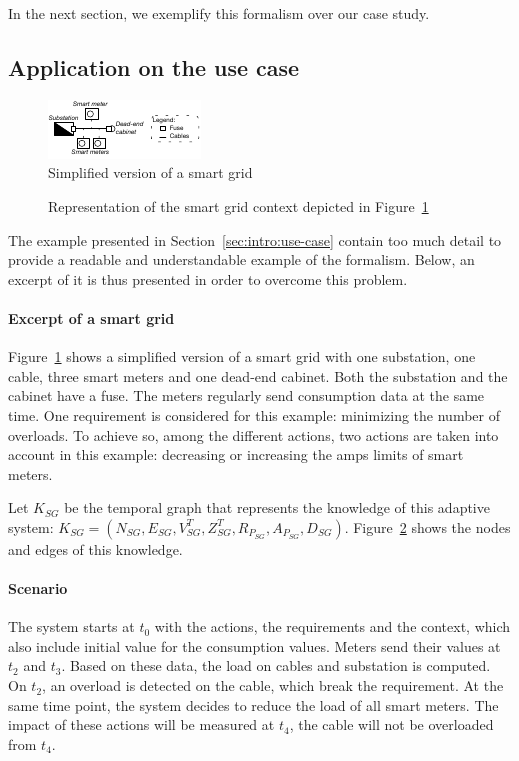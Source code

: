In the next section, we exemplify this formalism over our case study.


\subsection{Application on the use case}
\begin{figure}
	\centering
	\includegraphics[width=0.5\linewidth]{img/chapt-tkm/formalism/excerptSG}
	\caption{Simplified version of a smart grid}
	\label{fig:tkm:excerptSG}
\end{figure}

\begin{figure}
	\caption{Representation of the smart grid context depicted in Figure~\ref{fig:tkm:excerptSG}}
	\label{fig:tkm:contextFormExample}
\end{figure}


The example presented in Section~\ref{sec:intro:use-case} contain too much detail to provide a readable and understandable example of the formalism.
Below, an excerpt of it is thus presented in order to overcome this problem.


\paragraph{Excerpt of a smart grid}
Figure~\ref{fig:tkm:excerptSG} shows a simplified version of a smart grid with one substation, one cable, three smart meters and one dead-end cabinet.
Both the substation and the cabinet have a fuse.
The meters regularly send consumption data at the same time.
One requirement is considered for this example: minimizing the number of overloads.
To achieve so, among the different actions, two actions are taken into account in this example: decreasing or increasing the amps limits of smart meters.

Let $K_{SG}$ be the temporal graph that represents the knowledge of this adaptive system: $K_{SG} = (N_{SG}, E_{SG}, V^T_{SG}, Z^T_{SG}, R_{P_{SG}}, A_{P_{SG}}, D_{SG})$.
Figure~\ref{fig:tkm:contextFormExample} shows the nodes and edges of this knowledge.

\paragraph{Scenario}
The system starts at $t_0$ with the actions, the requirements and the context, which also include initial value for the consumption values.
Meters send their values at $t_2$ and $t_3$.
Based on these data, the load on cables and substation is computed.
On $t_2$, an overload is detected on the cable, which break the requirement.
At the same time point, the system decides to reduce the load of all smart meters.
The impact of these actions will be measured at $t_4$, \ie the cable will not be overloaded from $t_4$.

